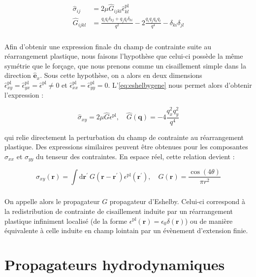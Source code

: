 \begin{equation}
\begin{aligned}
	\hat{\sigma}_{ij} &= 2\mu \hat{G}_{ijkl}\hat{\epsilon}_{kl}^\text{pl}\\
	\hat{G}_{ijkl} &= \frac{q_i q_l\delta_{kj}+q_j q_l\delta_{ki}}{q^2}-2\frac{q_iq_jq_kq_l}{q^4}-\delta_{ki}\delta_{jl}
\end{aligned}
\label{eq:eshelbygene}
\end{equation}

\subparagraph{}Afin d'obtenir une expression finale du champ de contrainte suite au réarrangement plastique, nous faisons l'hypothèse que celui-ci possède la même symétrie que le forçage, que nous prenons comme un cisaillement simple dans la direction $\hat{\mathbf{e}}_x$. Sous cette hypothèse, on a alors en deux dimensions $\hat{\epsilon}_{xy}^\text{pl} = \hat{\epsilon}_{yx}^\text{pl} = \hat{\epsilon}^\text{pl} \neq 0$ et $\hat{\epsilon}_{xx}^\text{pl} = \hat{\epsilon}_{yy}^\text{pl} = 0$. L'\autoref{eq:eshelbygene} nous permet alors d'obtenir l'expression :

\begin{equation}
	\hat{\sigma}_{xy} = 2\mu \hat{G} \epsilon^\text{pl}, \quad \hat{G}(\mathbf{q}) = -4\frac{q_x^2q_y^2}{q^4}
\end{equation}

\noindent qui relie directement la perturbation du champ de contrainte au réarrangement plastique. Des expressions similaires peuvent être obtenues pour les composantes $\sigma_{xx}$ et $\sigma_{yy}$ du tenseur des contraintes. En espace réel, cette relation devient :

\begin{equation}
	\sigma_{xy}(\mathbf{r}) = \int\mathrm{d}\mathbf{r}^\prime~G(\mathbf{r}-\mathbf{r}^\prime)\epsilon^\text{pl}(\mathbf{r}^\prime), \quad G(\mathbf{r}) = \frac{\cos (4\theta)}{\pi r^2}
	\label{eq:EshelbyReel}
\end{equation}

\subparagraph{}On appelle alors le propagateur $G$ propagateur d'Eshelby. Celui-ci correspond à la redistribution de contrainte de cisaillement induite par un réarrangement plastique infiniment localisé (de la forme $\epsilon^\text{pl}(\mathbf{r}) = \epsilon_0 \delta (\mathbf{r})$) ou de manière équivalente à celle induite en champ lointain par un évènement d'extension finie.

\section{Propagateurs hydrodynamiques}

